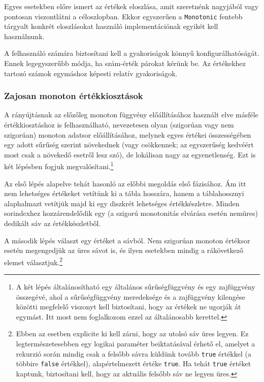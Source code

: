 \documentclass[
    parspace,
    noindent,
    nohyp,
]{elteiktdk}[2023/04/10]
\begin{document}
Egyes esetekben előre ismert az értékek eloszlása,
amit szeretnénk nagyjából vagy pontosan viszontlátni a céloszlopban.
Ekkor egyszerűen a \texttt{Monotonic} fentebb tárgyalt konkrét eloszlásokat használó
implementációnak egyikét kell használnunk.

A felhasználó számára biztosítani kell a gyakoriságok könnyű konfigurálhatóságát.
Ennek legegyszerűbb módja, ha szám-érték párokat kérünk be.
Az értékekhez tartozó számok egymáshoz képesti relatív gyakoriságok.

\subsubsection{Zajosan monoton értékkiosztások}

A rányújtásnak az előzőleg monoton függvény előállításához használt elve
másféle értékkiosztáshoz is felhasználható,
nevezetesen olyan (szigorúan vagy nem szigorúan) monoton adatsor előállításához,
melynek egyes értékei összességében egy adott sűrűség szerint növekednek
(vagy csökkennek; az egyszerűség kedvéért most csak a növekedő esetről lesz szó),
de lokálisan nagy az egyenetlenség.
Ezt is két lépésben fogjuk megvalósítani.\footnote{
  A két lépés általánosítható egy általános sűrűségfüggvény és egy zajfüggvény összegévé,
  ahol a sűrűségfüggvény meredeksége és a zajfüggvény kilengése közötti megfelelő viszonyt kell biztosítani,
  hogy az értékek ne ugorják át egymást.
  Itt most nem foglalkozom ezzel az általánosabb kerettel.
}

Az első lépés alapelve tehát hasonló az előbbi megoldás első fázisához.
Ám itt nem lehetséges értékeket vetítünk ki a tábla hosszára,
hanem a táblahossznyi alaphalmazt vetítjük majd ki egy diszkrét lehetséges értékkészletre.
Minden sorindexhez hozzárendelődik egy (a szigorú monotonitás elvárása esetén nemüres)
dedikált sáv az értékkészletből.

A második lépés választ egy értéket a sávból.
Nem szigorúan monoton értéksor esetén megengedjük az üres sávot is,
és ilyen esetekben mindig a rákövetkező elemet választjuk.\footnote{
  Ebben az esetben explicite ki kell zárni, hogy az utolsó sáv üres legyen.
  Ez legtermészetesebben egy logikai paraméter beiktatásával érhető el,
  amelyet a rekurzió során mindig csak a felsőbb sávra küldünk tovább \texttt{true} értékkel
  (a többire \texttt{false} értékkel),
  alapértelmezett értéke \texttt{true}.
  Ha tehát \texttt{true} értéket kaptunk, biztosítani kell, hogy az aktuális felsőbb sáv ne legyen üres.
}
\end{document}
